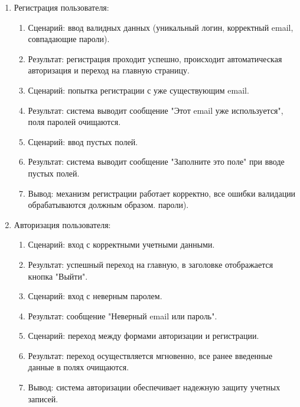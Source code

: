 \begin{enumerate}
\item Регистрация пользователя:
    \begin{enumerate}
     \item Сценарий: ввод валидных данных (уникальный логин, корректный email, совпадающие пароли).
     
     \item Результат: регистрация проходит успешно, происходит автоматическая авторизация и переход на главную страницу.
     
     \item Сценарий: попытка регистрации с уже существующим email.

     \item Результат: система выводит сообщение "Этот email уже используется", поля паролей очищаются.

     \item Сценарий: ввод пустых полей.

     \item Результат: система выводит сообщение "Заполните это поле" при вводе пустых полей.

     \item Вывод: механизм регистрации работает корректно, все ошибки валидации обрабатываются должным образом.
пароли).
    \end{enumerate}

\item Авторизация пользователя:
    \begin{enumerate}
     \item Сценарий: вход с корректными учетными данными.
     
     \item Результат: успешный переход на главную, в заголовке отображается кнопка "Выйти".
     
     \item Сценарий: вход с неверным паролем.

     \item Результат: сообщение "Неверный email или пароль".

     \item Сценарий: переход между формами авторизации и регистрации.

     \item Результат: переход осуществляется мгновенно, все ранее введенные данные в полях очищаются.

     \item Вывод: система авторизации обеспечивает надежную защиту учетных записей.
    \end{enumerate}


\end{enumerate}
